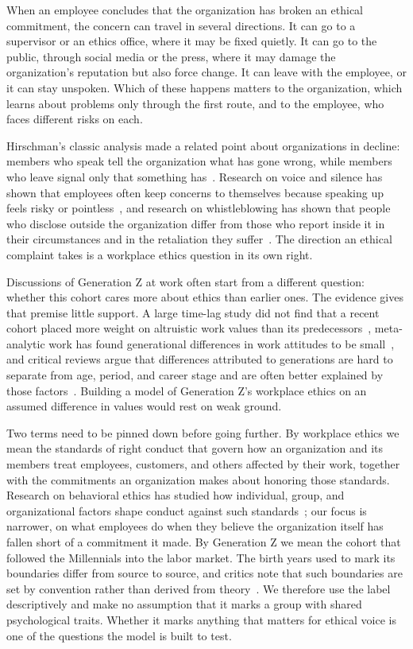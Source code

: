 When an employee concludes that the organization has broken an ethical commitment, the concern can travel in several directions. It can go to a supervisor or an ethics office, where it may be fixed quietly. It can go to the public, through social media or the press, where it may damage the organization's reputation but also force change. It can leave with the employee, or it can stay unspoken. Which of these happens matters to the organization, which learns about problems only through the first route, and to the employee, who faces different risks on each.

Hirschman's classic analysis made a related point about organizations in decline: members who speak tell the organization what has gone wrong, while members who leave signal only that something has~\citep{hirschman1970exit}. Research on voice and silence has shown that employees often keep concerns to themselves because speaking up feels risky or pointless~\citep{morrison2000organizational,milliken2003exploratory}, and research on whistleblowing has shown that people who disclose outside the organization differ from those who report inside it in their circumstances and in the retaliation they suffer~\citep{dworkin1998internal}. The direction an ethical complaint takes is a workplace ethics question in its own right.

Discussions of Generation Z at work often start from a different question: whether this cohort cares more about ethics than earlier ones. The evidence gives that premise little support. A large time-lag study did not find that a recent cohort placed more weight on altruistic work values than its predecessors~\citep{twenge2010generational}, meta-analytic work has found generational differences in work attitudes to be small~\citep{costanza2012generational}, and critical reviews argue that differences attributed to generations are hard to separate from age, period, and career stage and are often better explained by those factors~\citep{lyons2014generational,rudolph2021generations}. Building a model of Generation Z's workplace ethics on an assumed difference in values would rest on weak ground.

Two terms need to be pinned down before going further. By workplace ethics we mean the standards of right conduct that govern how an organization and its members treat employees, customers, and others affected by their work, together with the commitments an organization makes about honoring those standards. Research on behavioral ethics has studied how individual, group, and organizational factors shape conduct against such standards~\citep{trevino2006behavioral}; our focus is narrower, on what employees do when they believe the organization itself has fallen short of a commitment it made. By Generation Z we mean the cohort that followed the Millennials into the labor market. The birth years used to mark its boundaries differ from source to source, and critics note that such boundaries are set by convention rather than derived from theory~\citep{rudolph2021generations}. We therefore use the label descriptively and make no assumption that it marks a group with shared psychological traits. Whether it marks anything that matters for ethical voice is one of the questions the model is built to test.

